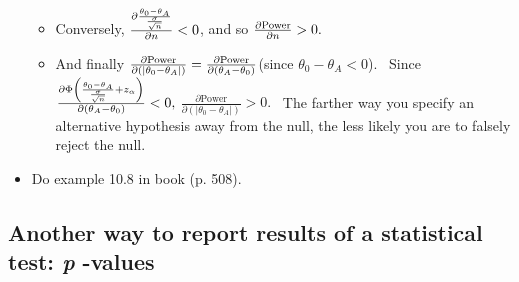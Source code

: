 \documentclass[11pt]{article}
\begin{document}
\begin{itemize}
\begin{itemize}
\item Conversely, $\frac{\partial \frac{\theta _{0}-\theta _{A}}{\frac{%
\sigma }{\sqrt{n}}}}{\partial n}<0$, and so $\frac{\partial \text{Power}}{%
\partial n}>0.$

\item And finally $\frac{\partial \text{Power}}{\partial \left( \left\vert
\theta _{0}-\theta _{A}\right\vert \right) }=\frac{\partial \text{Power}}{%
\partial \left( \theta _{A}-\theta _{0}\right) }$(since $\theta _{0}-\theta
_{A}<0$). \ Since $\frac{\partial \Phi \left( \frac{\theta _{0}-\theta _{A}}{%
\frac{\sigma }{\sqrt{n}}}+z_{\alpha }\right) }{\partial \left( \theta
_{A}-\theta _{0}\right) }<0,$ $\frac{\partial \text{Power}}{\partial \left(
\left\vert \theta _{0}-\theta _{A}\right\vert \right) }>0.$ \ The farther
way you specify an alternative hypothesis away from the null, the less
likely you are to falsely reject the null.
\end{itemize}

\item Do example 10.8 in book (p. 508).
\end{itemize}

\subsection{Another way to report results of a statistical test: \textit{p}%
-values}
\end{document}
